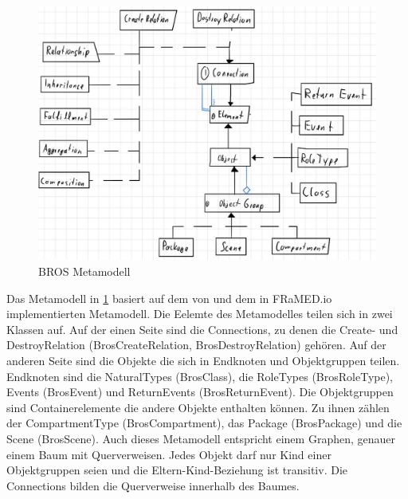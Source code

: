 \begin{figure}
    \centering
    \includegraphics[width=\textwidth,keepaspectratio]{../images/brosMetamodell.jpg}%
    \caption{BROS Metamodell}%
    \label{fig:brosMetamodell}
\end{figure}

Das Metamodell in \cref{fig:brosMetamodell} basiert auf dem von \cite{Schoen} und dem in FRaMED.io implementierten Metamodell.
Die Eelemte des Metamodelles teilen sich in zwei Klassen auf.
Auf der einen Seite sind die Connections, zu denen die Create- und DestroyRelation (BrosCreateRelation, BrosDestroyRelation) gehören.
Auf der anderen Seite sind die Objekte die sich in Endknoten und Objektgruppen teilen.
Endknoten sind die NaturalTypes (BrosClass), die RoleTypes (BrosRoleType), Events (BrosEvent) und ReturnEvents (BrosReturnEvent).
Die Objektgruppen sind Containerelemente die andere Objekte enthalten können.
Zu ihnen zählen der CompartmentType (BrosCompartment), das Package (BrosPackage) und die Scene (BrosScene).
Auch dieses Metamodell entspricht einem Graphen, genauer einem Baum mit Querverweisen.
Jedes Objekt darf nur Kind einer Objektgruppen seien und die Eltern-Kind-Beziehung ist transitiv.
Die Connections bilden die Querverweise innerhalb des Baumes.
